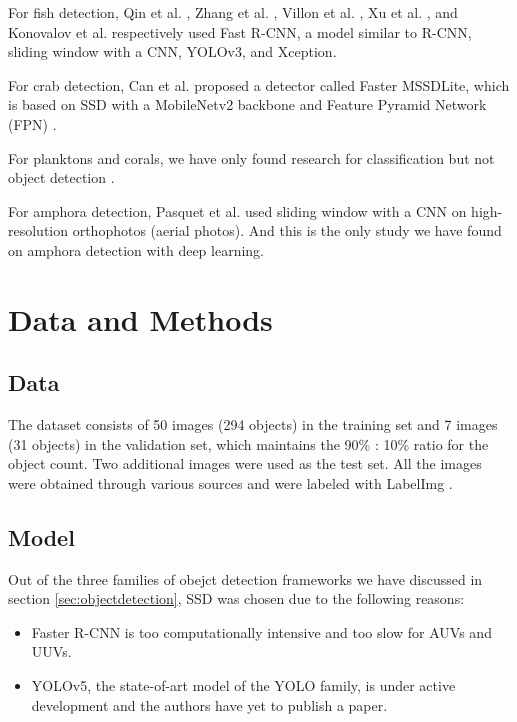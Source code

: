 \documentclass[a4paper, 11pt, oneside]{article}
\begin{document}
  For fish detection, Qin et al. \cite{qin2015underwater, li2015fast}, Zhang et al. \cite{zhang2016unsupervised},
  Villon et al. \cite{villon2016coral}, Xu et al. \cite{xu2018underwater}, and Konovalov et al.
  \cite{konovalov2019underwater} respectively used Fast R-CNN, a model similar to R-CNN, sliding window with a CNN,
  YOLOv3, and Xception.

  For crab detection, Can et al. \cite{cao2020real} proposed a detector called Faster MSSDLite, which is based on SSD with
  a MobileNetv2 backbone and Feature Pyramid Network (FPN) \cite{lin2017feature}.

  For planktons and corals, we have only found research for classification but not object detection
  \cite{qin2015underwater, moniruzzaman2017deep}.

  For amphora detection, Pasquet et al. \cite{mccarthy20193d, pasquet2017amphora} used sliding window with a CNN on
  high-resolution orthophotos (aerial photos). And this is the only study we have found on amphora detection with deep
  learning.

  \section{Data and Methods}

  \subsection{Data}

  The dataset consists of 50 images (294 objects) in the training set and 7 images (31 objects) in the validation set,
  which maintains the 90\% : 10\% ratio for the object count. Two additional images were used as the test set. All the
  images were obtained through various sources
  \cite{googleimages, scuba, itinari, whoi, phoenician, auscape, hakai, groplan, ionian, sanisera} and were labeled
  with LabelImg \cite{labelimg}.

  \subsection{Model}

  Out of the three families of obejct detection frameworks we have discussed in section \ref{sec:objectdetection}, SSD was
  chosen due to the following reasons:

  \begin{itemize}
    \item Faster R-CNN is too computationally intensive and too slow for AUVs and UUVs.
    \item YOLOv5, the state-of-art model of the YOLO family, is under active development and the authors have yet to
    publish a paper.
  \end{itemize}
\end{document}

